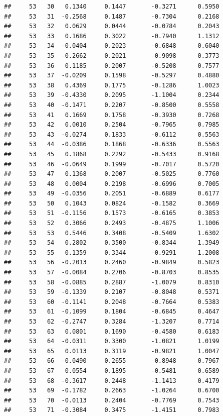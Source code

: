 \documentclass[
]{article}
\begin{document}
\begin{verbatim}
##     53   30   0.1340     0.1447       -0.3271      0.5950  
##     53   31  -0.2568     0.1487       -0.7304      0.2168  
##     53   32   0.0629     0.0444       -0.0784      0.2043  
##     53   33   0.1686     0.3022       -0.7940      1.1312  
##     53   34  -0.0404     0.2023       -0.6848      0.6040  
##     53   35  -0.2662     0.2021       -0.9098      0.3773  
##     53   36   0.1185     0.2007       -0.5208      0.7577  
##     53   37  -0.0209     0.1598       -0.5297      0.4880  
##     53   38   0.4369     0.1775       -0.1286      1.0023  
##     53   39  -0.4330     0.2095       -1.1004      0.2344  
##     53   40  -0.1471     0.2207       -0.8500      0.5558  
##     53   41   0.1669     0.1758       -0.3930      0.7268  
##     53   42   0.0010     0.2504       -0.7965      0.7985  
##     53   43  -0.0274     0.1833       -0.6112      0.5563  
##     53   44  -0.0386     0.1868       -0.6336      0.5563  
##     53   45   0.1868     0.2292       -0.5433      0.9168  
##     53   46  -0.0649     0.1999       -0.7017      0.5720  
##     53   47   0.1368     0.2007       -0.5025      0.7760  
##     53   48   0.0004     0.2198       -0.6996      0.7005  
##     53   49  -0.0356     0.2051       -0.6889      0.6177  
##     53   50   0.1043     0.0824       -0.1582      0.3669  
##     53   51  -0.1156     0.1573       -0.6165      0.3853  
##     53   52   0.3066     0.2493       -0.4875      1.1006  
##     53   53   0.5446     0.3408       -0.5409      1.6302  
##     53   54   0.2802     0.3500       -0.8344      1.3949  
##     53   55   0.1359     0.3344       -0.9291      1.2008  
##     53   56  -0.2013     0.2460       -0.9849      0.5823  
##     53   57  -0.0084     0.2706       -0.8703      0.8535  
##     53   58  -0.0885     0.2887       -1.0079      0.8310  
##     53   59  -0.1339     0.2107       -0.8048      0.5371  
##     53   60  -0.1141     0.2048       -0.7664      0.5383  
##     53   61  -0.1099     0.1804       -0.6845      0.4647  
##     53   62  -0.2747     0.3284       -1.3207      0.7714  
##     53   63   0.0801     0.1690       -0.4580      0.6183  
##     53   64  -0.0311     0.3300       -1.0821      1.0199  
##     53   65   0.0113     0.3119       -0.9821      1.0047  
##     53   66  -0.0490     0.2655       -0.8948      0.7967  
##     53   67   0.0554     0.1895       -0.5481      0.6589  
##     53   68  -0.3617     0.2448       -1.1413      0.4179  
##     53   69  -0.1782     0.2663       -1.0264      0.6700  
##     53   70  -0.0113     0.2404       -0.7769      0.7543  
##     53   71  -0.3084     0.3475       -1.4151      0.7983  

\end{verbatim}
\end{document}
